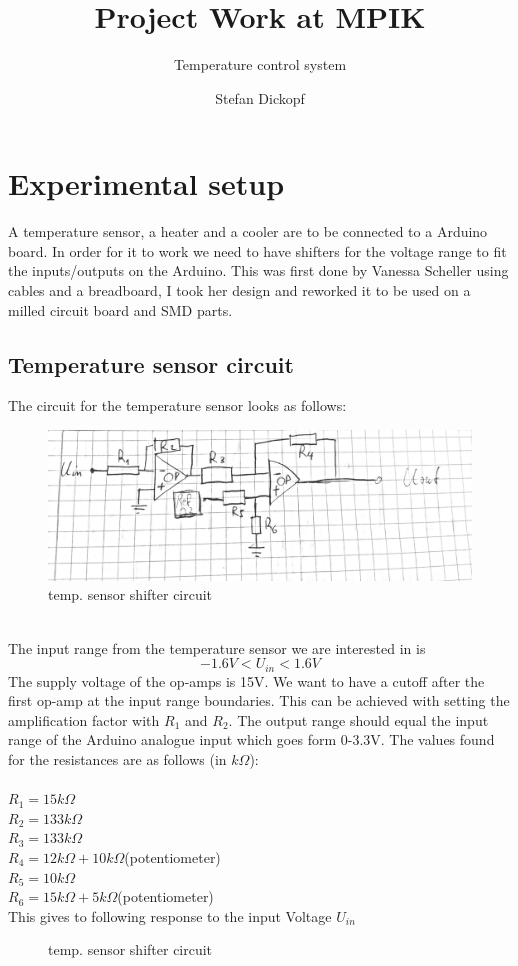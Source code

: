 \documentclass[12pt]{scrartcl}
\begin{document}
  \title{Project Work at MPIK}
  \subtitle{Temperature control system}
  \date{}
  \author{Stefan Dickopf}
  \maketitle

  \section{Experimental setup}
    A temperature sensor, a heater and a cooler are to be connected to a Arduino
    board. In order for it to work we need to have shifters for the voltage
    range to fit the inputs/outputs on the Arduino. This was first done by
    Vanessa Scheller using cables and a breadboard, I took her design and
    reworked it to be used on a milled circuit board and SMD parts.

    \subsection{Temperature sensor circuit}
      The circuit for the temperature sensor looks as follows:
      \begin{figure}[h]
        \includegraphics[width = \textwidth]{circ.png}
        \caption{temp. sensor shifter circuit}
        \label{fig1}
      \end{figure}
      \\The input range from the temperature sensor we are interested in is
      $$-1.6V < U_{in} < 1.6V$$
      The supply voltage of the op-amps is 15V. We want to have a cutoff after
      the first op-amp at the input range boundaries. This can be achieved with
      setting the amplification factor with $R_1$ and $R_2$. The output range
      should equal the input range of the Arduino analogue input which goes form
      0-3.3V. The values found for the resistances are as follows (in $k\Omega$):
      \\\\
      $R_1 = 15k\Omega$ \\ $R_2 = 133k\Omega$ \\ $R_3 = 133k\Omega$ \\
      $R_4 = 12k\Omega + 10k\Omega$(potentiometer) \\ $R_5 = 10k\Omega$ \\
      $R_6 = 15k\Omega + 5k\Omega$(potentiometer) \\
      This gives to following response to the input Voltage $U_{in}$
      \begin{figure}[h]
        
        \caption{temp. sensor shifter circuit}
        \label{fig2}
      \end{figure}
\end{document}
